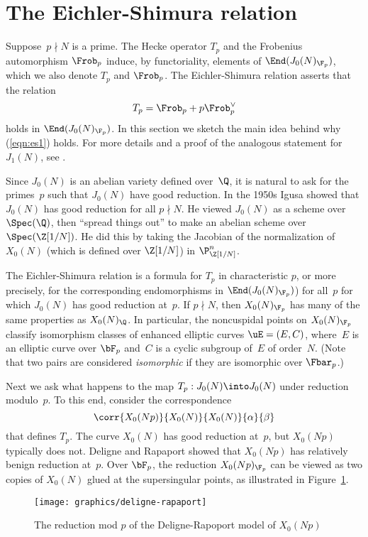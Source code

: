 \documentclass{report}
\begin{document}
\section{The Eichler-Shimura relation}\label{sec:eichler-shimura}
Suppose~$p\nmid N$ is a prime.  The Hecke operator $T_p$ and the
Frobenius automorphism $\Frob_p$ induce, by functoriality, elements of
$\End(J_0(N)_{\F_p})$, which we also denote $T_p$ and $\Frob_p$.  The
Eichler-Shimura relation asserts that the relation
\begin{equation}\label{eqn:es1}
   T_p = \Frob_p + p\Frob_p^{\vee}
\end{equation}
holds in $\End(J_0(N)_{\F_p})$.  In this section we sketch the main
idea behind why (\ref{eqn:es1}) holds.  For more details and a proof
of the analogous statement for $J_1(N)$, see
\cite{conrad:shimura}.

Since $J_0(N)$ is an abelian variety defined over~$\Q$, it is natural
to ask for the primes~$p$ such that $J_0(N)$ have good reduction.  In
the 1950s Igusa showed  that
$J_0(N)$ has good reduction for all $p\nmid{}N$.  He viewed $J_0(N)$
as a scheme over $\Spec(\Q)$, then ``spread things out'' to make an
abelian scheme over $\Spec(\Z[1/N])$.  He did this by taking the
Jacobian of the normalization of
$X_0(N)$ (which is defined over $\Z[1/N]$) in $\P^n_{\Z[1/N]}$.

The Eichler-Shimura relation is a formula for
$T_p$ in characteristic $p$, or more precisely, for the corresponding
endomorphisms in $\End(J_0(N)_{\F_p})$) for all~$p$ for which $J_0(N)$
has good reduction at~$p$. If $p\nmid N$, then $X_0(N)_{\F_p}$ has
many of the same properties as $X_0(N)_{\Q}$.  In particular, the
noncuspidal points on $X_0(N)_{\F_p}$ classify isomorphism classes of
enhanced elliptic curves $\uE=(E,C)$, where~$E$ is an elliptic curve
over $\bF_p$ and~$C$ is a cyclic subgroup of~$E$ of order~$N$.  (Note
that two pairs are considered {\em isomorphic} if they are isomorphic
over $\Fbar_p$.)

Next we ask what happens to the map $T_p:J_0(N)\into J_0(N)$
under reduction modulo~$p$.
To this end, consider the correspondence
\[
  \corr{X_0(Np)}{X_0(N)}{X_0(N)}{\alpha}{\beta}
\]
that defines $T_p$.  The curve $X_0(N)$ has good reduction at~$p$, but
$X_0(Np)$ typically does not.  Deligne and Rapaport
\cite{deligne-rapoport} showed that $X_0(Np)$ has relatively benign
reduction at~$p$. Over $\bF_p$, the reduction $X_0(Np)_{\F_p}$ can be
viewed as two copies of $X_0(N)$ glued at the supersingular points,
as illustrated in Figure~\ref{fig:deligne-rapoport}.
\begin{figure}
\texttt{[image: graphics/deligne-rapaport]}
\caption{The reduction mod $p$ of the Deligne-Rapoport
model of $X_0(Np)$%
\label{fig:deligne-rapoport}}
\end{figure}
\end{document}
